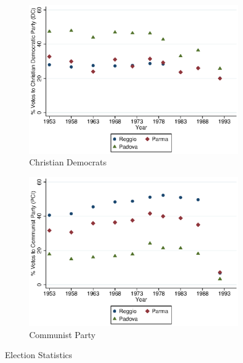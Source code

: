     \begin{figure}[H]
      \centering
        \begin{subfigure}[t]{0.49\textwidth}
          \includegraphics[width=\textwidth]{../../output/image/DC.eps}
\caption{Christian Democrats}
        \end{subfigure}
        \begin{subfigure}[t]{0.49\textwidth}
          \includegraphics[width=\textwidth]{../../output/image/PCI.eps}
 \caption{Communist Party}
        \end{subfigure}
      \caption{Election Statistics}  \label{fig:election}
    \end{figure}

